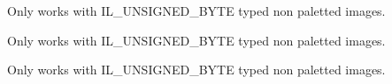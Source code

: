 
\begin{DoxyRefList}
\item[\label{bug__bug000001}%
\hypertarget{bug__bug000001}{}%
Global \hyperlink{group__ilu__filter_gacb6e1a0e8dc10748f1cfbf60b1f8c350}{ilu\+Alienify} (void)]Only works with I\+L\+\_\+\+U\+N\+S\+I\+G\+N\+E\+D\+\_\+\+B\+Y\+T\+E typed non paletted images.


\item[\label{bug__bug000002}%
\hypertarget{bug__bug000002}{}%
Global \hyperlink{group__ilu__colour_ga1c019783a7ab60a1b9fee1ed5b2aadbe}{ilu\+Colours\+Used} ()]Only works with I\+L\+\_\+\+U\+N\+S\+I\+G\+N\+E\+D\+\_\+\+B\+Y\+T\+E typed non paletted images.


\item[\label{bug__bug000003}%
\hypertarget{bug__bug000003}{}%
Global \hyperlink{group__ilu__colour_ga674c6a79168815f579338c30e94cd086}{ilu\+Contrast} (I\+Lfloat Contrast)]Only works with I\+L\+\_\+\+U\+N\+S\+I\+G\+N\+E\+D\+\_\+\+B\+Y\+T\+E typed non paletted images.


\end{DoxyRefList}